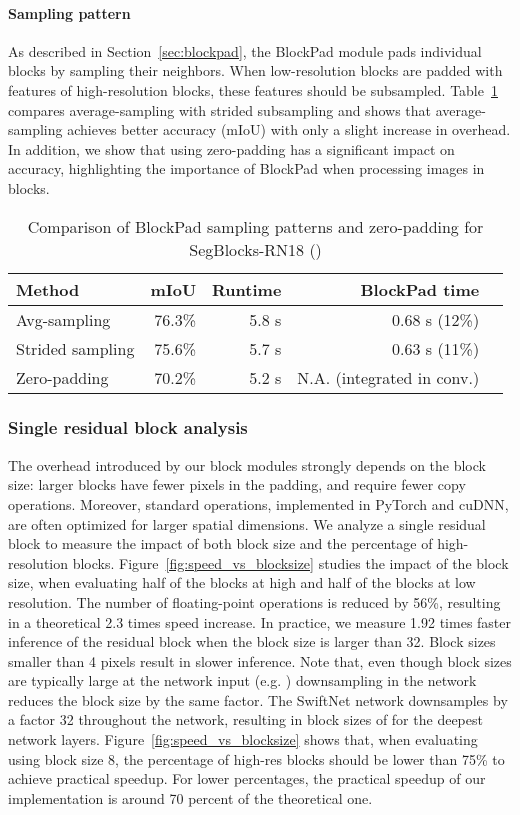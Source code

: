 \paragraph*{\textbf{Sampling pattern}}
As described in Section~\ref{sec:blockpad}, the BlockPad module pads individual blocks by sampling their neighbors. When low-resolution blocks are padded with features of high-resolution blocks, these features should be subsampled. Table~\ref{tab:sampling} compares average-sampling with strided subsampling and shows that average-sampling achieves better accuracy (mIoU) with only a slight increase in overhead. In addition, we show that using zero-padding has a significant impact on accuracy, highlighting the importance of BlockPad when processing images in blocks. 

\begin{table}[!tb]
\scriptsize
\caption{Comparison of BlockPad sampling patterns and zero-padding for SegBlocks-RN18 () \label{tab:sampling}}
\centering
\begin{tabular}{@{}lrrrr@{}}
\toprule
\textbf{Method} & \textbf{mIoU} & \textbf{Runtime} & \textbf{BlockPad time} \\ \midrule
Avg-sampling & 76.3\% & 5.8 s & 0.68 s (12\%) \\
Strided sampling & 75.6\% & 5.7 s & 0.63 s (11\%) \\
Zero-padding & 70.2\% & 5.2 s & N.A. (integrated in conv.)\\
\bottomrule
\end{tabular}
\end{table}

\subsubsection{Single residual block analysis}
The overhead introduced by our block modules strongly depends on the block size: larger blocks have fewer pixels in the padding, and require fewer copy operations. Moreover, standard operations, implemented in PyTorch and cuDNN, are often optimized for larger spatial dimensions. We analyze a single residual block to measure the impact of both block size and the percentage of high-resolution blocks.
Figure~\ref{fig:speed_vs_blocksize} studies the impact of the block size, when evaluating half of the blocks at high and half of the blocks at low resolution. The number of floating-point operations is reduced by 56\%, resulting in a theoretical 2.3 times speed increase. In practice, we measure 1.92 times faster inference of the residual block when the block size is larger than 32. Block sizes smaller than 4 pixels result in {slower} inference. Note that, even though block sizes are typically large at the network input (e.g. ) downsampling in the network reduces the block size by the same factor. The SwiftNet network downsamples by a factor 32 throughout the network, resulting in block sizes of  for the deepest network layers.
Figure~\ref{fig:speed_vs_blocksize} shows that, when evaluating using block size 8, the percentage of high-res blocks should be lower than 75\% to achieve practical speedup. For lower percentages, the practical speedup of our implementation is around 70 percent of the theoretical one.

